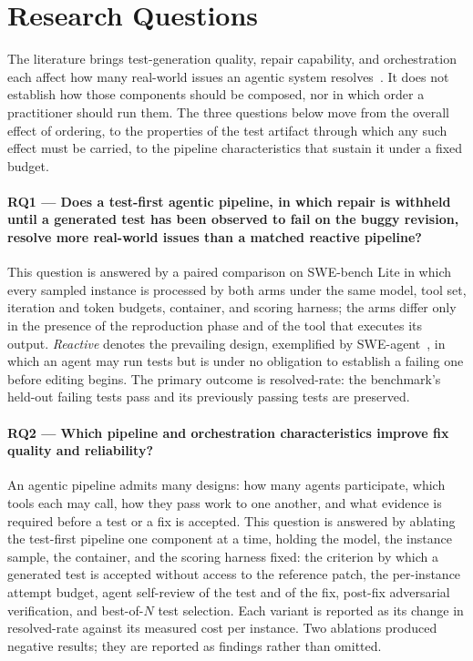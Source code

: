 \section{Research Questions}
\label{sec:intro-rqs}

The literature brings test-generation quality, repair capability, and
orchestration each affect how many real-world issues an agentic system
resolves~\cite{Meng2024Empirical}. It does not establish how those components
should be composed, nor in which order a practitioner should run them. The three
questions below move from the overall effect of ordering, to the properties of
the test artifact through which any such effect must be carried, to the pipeline
characteristics that sustain it under a fixed budget.

\paragraph{RQ1 --- Does a test-first agentic pipeline, in which repair is
withheld until a generated test has been observed to fail on the buggy revision,
resolve more real-world issues than a matched reactive pipeline?}
This question is answered by a paired comparison on SWE-bench Lite in which every
sampled instance is processed by both arms under the same model, tool set,
iteration and token budgets, container, and scoring harness; the arms differ only
in the presence of the reproduction phase and of the tool that executes its
output. \emph{Reactive} denotes the prevailing design, exemplified by
SWE-agent~\cite{Yang2024SWEagent}, in which an agent may run tests but is under
no obligation to establish a failing one before editing begins. The primary
outcome is resolved-rate: the benchmark's held-out failing tests pass and its
previously passing tests are preserved.

\paragraph{RQ2 --- Which pipeline and orchestration characteristics improve fix
quality and reliability?}
An agentic pipeline admits many designs: how many agents participate, which tools each may call, how they pass work to one another, and what evidence is required before a test or a fix is accepted. This question is answered by ablating the test-first pipeline one component at a time, holding the model, the instance sample, the container, and the scoring harness fixed: the criterion by which a generated test is accepted without access to the reference patch, the per-instance attempt budget, agent self-review of the test and of the fix, post-fix adversarial verification, and best-of-$N$ test selection. Each variant is reported as its change in resolved-rate against its measured cost per instance. Two ablations produced negative results; they are reported as findings rather than omitted. 

